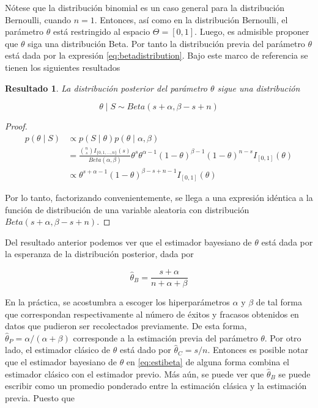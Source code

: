 \documentclass[
  10pt,
  spanish,
]{book}
\newtheorem{proposition}{Resultado}[chapter]
\theoremstyle{definition}
\theoremstyle{definition}
\theoremstyle{definition}
\theoremstyle{definition}
\theoremstyle{remark}
\begin{document}
Nótese que la distribución binomial es un caso general para la
distribución Bernoulli, cuando \(n=1\). Entonces, así como en la
distribución Bernoulli, el parámetro \(\theta\) está restringido al
espacio \(\Theta=[0,1]\). Luego, es admisible proponer que \(\theta\) siga
una distribución Beta. Por tanto la distribución previa del parámetro
\(\theta\) está dada por la expresión \eqref{eq:betadistribution}. Bajo
este marco de referencia se tienen los siguientes resultados

\begin{proposition}
\protect\hypertarget{prp:unnamed-chunk-11}{}{\label{prp:unnamed-chunk-11} }La distribución posterior del parámetro \(\theta\) sigue una distribución

\begin{equation*}
\theta \mid S \sim Beta(s+\alpha,\beta-s+n)
\end{equation*}
\end{proposition}

\begin{proof}
\iffalse{} {Prueba. } \fi{}\begin{align*}
p(\theta \mid S)&\propto p(S \mid \theta)p(\theta \mid \alpha,\beta)\\
&=\frac{\binom{n}{s}I_{\{0,1,\ldots,n\}}(s)}{Beta(\alpha,\beta)}
\theta^s\theta^{\alpha-1} (1-\theta)^{\beta-1}(1-\theta)^{n-s}I_{[0,1]}(\theta)\\
&\propto \theta^{s+\alpha-1} (1-\theta)^{\beta-s+n-1}I_{[0,1]}(\theta)
\end{align*}

Por lo tanto, factorizando convenientemente, se llega a una expresión idéntica a la función de distribución de una variable aleatoria con distribución \(Beta(s+\alpha,\beta-s+n)\).
\end{proof}

Del resultado anterior podemos ver que el estimador bayesiano de
\(\theta\) está dada por la esperanza de la distribución posterior, dada
por

\begin{equation}
\label{eq:estibeta}
\hat{\theta}_{B}=\frac{s+\alpha}{n+\alpha+\beta}
\end{equation}

En la práctica, se acostumbra a escoger los hiperparámetros \(\alpha\) y
\(\beta\) de tal forma que correspondan respectivamente al número de
éxitos y fracasos obtenidos en datos que pudieron ser recolectados
previamente. De esta forma, \(\hat{\theta}_{P}=\alpha/(\alpha+\beta)\)
corresponde a la estimación previa del parámetro \(\theta\). Por otro
lado, el estimador clásico de \(\theta\) está dado por
\(\hat{\theta}_{C}=s/n\). Entonces es posible notar que el estimador
bayesiano de \(\theta\) en \eqref{eq:estibeta} de alguna forma combina el
estimador clásico con el estimador previo. Más aún, se puede ver que
\(\hat{\theta}_{B}\) se puede escribir como un promedio ponderado entre la
estimación clásica y la estimación previa. Puesto que
\end{document}

